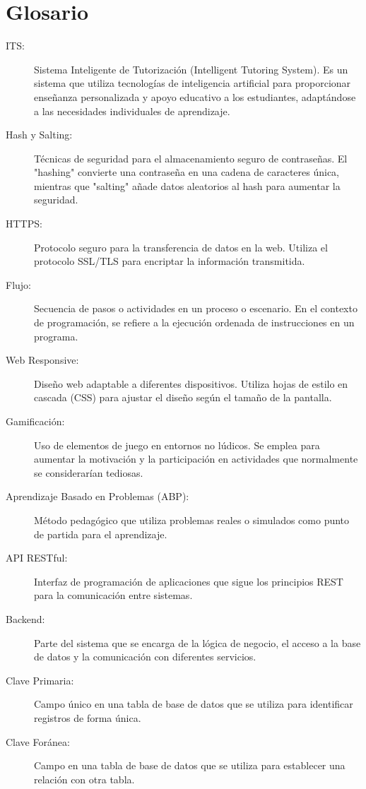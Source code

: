 \section*{Glosario}

\begin{description}
    \item[ITS:] Sistema Inteligente de Tutorización (Intelligent Tutoring System). Es un sistema que utiliza tecnologías de inteligencia artificial para proporcionar enseñanza personalizada y apoyo educativo a los estudiantes, adaptándose a las necesidades individuales de aprendizaje.
    \item[Hash y Salting:] Técnicas de seguridad para el almacenamiento seguro de contraseñas. El "hashing" convierte una contraseña en una cadena de caracteres única, mientras que "salting" añade datos aleatorios al hash para aumentar la seguridad.
    \item[HTTPS:] Protocolo seguro para la transferencia de datos en la web. Utiliza el protocolo SSL/TLS para encriptar la información transmitida.
    \item[Flujo:] Secuencia de pasos o actividades en un proceso o escenario. En el contexto de programación, se refiere a la ejecución ordenada de instrucciones en un programa.
    \item[Web Responsive:] Diseño web adaptable a diferentes dispositivos. Utiliza hojas de estilo en cascada (CSS) para ajustar el diseño según el tamaño de la pantalla.
    \item[Gamificación:] Uso de elementos de juego en entornos no lúdicos. Se emplea para aumentar la motivación y la participación en actividades que normalmente se considerarían tediosas.
    \item[Aprendizaje Basado en Problemas (ABP):] Método pedagógico que utiliza problemas reales o simulados como punto de partida para el aprendizaje.
    \item[API RESTful:] Interfaz de programación de aplicaciones que sigue los principios REST para la comunicación entre sistemas.
    \item[Backend:] Parte del sistema que se encarga de la lógica de negocio, el acceso a la base de datos y la comunicación con diferentes servicios.
    \item[Clave Primaria:] Campo único en una tabla de base de datos que se utiliza para identificar registros de forma única.
    \item[Clave Foránea:] Campo en una tabla de base de datos que se utiliza para establecer una relación con otra tabla.

\end{description}
